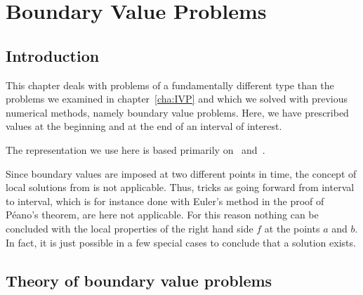 \chapter{Boundary Value Problems}
\label{chapter:rwa}
\section{Introduction}
\begin{intro}
  This chapter deals with problems of a fundamentally different type
  than the problems we examined in chapter~\ref{cha:IVP} and which we
  solved with previous numerical methods, namely boundary value
  problems. Here, we have prescribed values at the beginning and at
  the end of an interval of interest.

  The representation we use here is based primarily
  on~\cite{DeuflhardBornemann08} and~\cite{Rannacher12}.
\end{intro}




\begin{remark}
  Since boundary values are imposed at two different
  points in time, the concept of local solutions from
   is not applicable.
  Thus, tricks as going forward from interval to interval, which is
  for instance done with Euler's method in the proof of Péano's
  theorem, are here not applicable.  For this reason nothing can be
  concluded with the local properties of the right hand side $f$ at
  the points $a$ and $b$. In fact, it is just possible in a few
  special cases to conclude that a solution exists.
\end{remark}


\section{Theory of boundary value problems}

